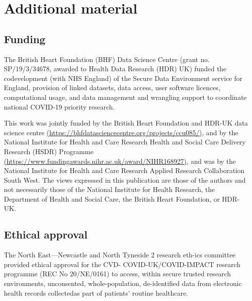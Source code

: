 \section*{Additional material}

\subsection*{Funding}

The British Heart Foundation (BHF) Data Science Centre (grant no. SP/19/3/34678, awarded to Health Data Research (HDR) UK) funded the codevelopment (with NHS England) of the Secure Data Environment service for England, provision of linked datasets, data access, user software licences, computational usage, and data management and wrangling support to coordinate national COVID-19 priority research.

This work was jointly funded by the British Heart Foundation and HDR-UK data science centre \url{(https://bhfdatasciencecentre.org/projects/ccu085/)}, and by the National Institute for Health and Care Research Health and Social Care Delivery Research (HSDR) Programme \url{(https://www.fundingawards.nihr.ac.uk/award/NIHR168927)}, and was by the National Institute for Health and Care Research Applied Research Collaboration South West. The views expressed in this publication are those of the authors and not necessarily those of the National Institute for Health Research, the Department of Health and Social Care, the British Heart Foundation, or HDR-UK.


\subsection{Ethical approval}

The North East—Newcastle and North Tyneside 2 research eth-ics committee provided ethical approval for the CVD- COVID-UK/COVID-IMPACT research programme (REC No 20/NE/0161) to access, within secure trusted research environments, unconsented, whole-population, de-identified data from electronic health records collectedas part of patients' routine healthcare.